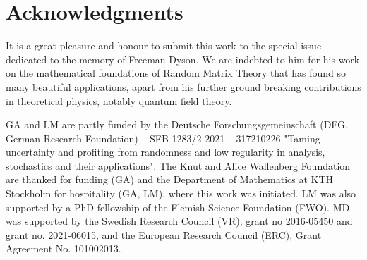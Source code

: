 \documentclass[%
 jmp,
cp,  %
 amsmath,amsthm,amssymb,%
 reprint,%
onecolumn]{revtex4-2}
\begin{document}
\section*{Acknowledgments}

It is a great pleasure and honour to submit this work to the special issue dedicated to the memory of Freeman Dyson. We are indebted to him for his work on the mathematical foundations of Random Matrix Theory that has found so many beautiful applications, apart from his further ground breaking contributions in theoretical physics, notably quantum field theory.



GA and LM are partly funded by the Deutsche Forschungsgemeinschaft (DFG, German Research Foundation) – SFB 1283/2 2021 – 317210226 "Taming uncertainty and profiting from randomness and low regularity in analysis, stochastics and their applications". The Knut and Alice Wallenberg Foundation are thanked for funding (GA) and the Department of Mathematics at KTH Stockholm for hospitality (GA, LM), where this work was initiated. LM was also supported by a PhD fellowship of the Flemish Science Foundation (FWO). 
MD was supported  by the Swedish Research Council (VR), grant no 2016-05450 and grant no. 2021-06015, and the European Research Council (ERC),  Grant Agreement No. 101002013. 
\end{document}
